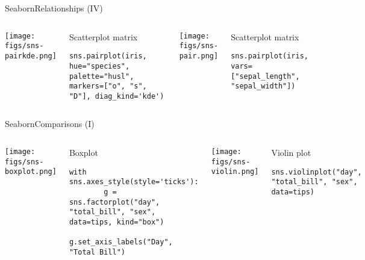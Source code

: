 \documentclass[10pt,compress]{beamer} %
\begin{document}
\begin{frame}[fragile]{Seaborn}{Relationships (IV)}
	\begin{columns}
	\texttt{[image: figs/sns-pairkde.png]}\\
	\begin{exampleblock}{\footnotesize{Scatterplot matrix}}
	\vspace{-0.2cm} 
	\begin{lstlisting}[basicstyle=\tiny]
	sns.pairplot(iris, hue="species", palette="husl", markers=["o", "s", "D"], diag_kind='kde')
	\end{lstlisting}
	\vspace{-0.2cm} 
	\end{exampleblock}

	\texttt{[image: figs/sns-pair.png]}\\
	\begin{exampleblock}{\footnotesize{Scatterplot matrix}}
	\vspace{-0.2cm} 
	\begin{lstlisting}[basicstyle=\tiny]
	sns.pairplot(iris, vars=["sepal_length", "sepal_width"])
	\end{lstlisting}
	\vspace{-0.2cm} 
	\end{exampleblock}

	\end{columns}
\end{frame}

\begin{frame}[fragile]{Seaborn}{Comparisons (I)}
	\begin{columns}
	\texttt{[image: figs/sns-boxplot.png]}\\
	\begin{exampleblock}{\footnotesize{Boxplot}}
	\vspace{-0.2cm} 
	\begin{lstlisting}[basicstyle=\tiny]
	with sns.axes_style(style='ticks'):
	    g = sns.factorplot("day", "total_bill", "sex", data=tips, kind="box")
		g.set_axis_labels("Day", "Total Bill")
	\end{lstlisting}
	\vspace{-0.2cm} 
	\end{exampleblock}

 	 \column{0.5\textwidth}
	\texttt{[image: figs/sns-violin.png]}\\
	\begin{exampleblock}{\footnotesize{Violin plot}}
	\vspace{-0.2cm} 
	\begin{lstlisting}[basicstyle=\tiny]
	sns.violinplot("day", "total_bill", "sex", data=tips)
	\end{lstlisting}
	\vspace{-0.2cm} 
	\end{exampleblock}

	\end{columns}
\end{frame}
\end{document}
